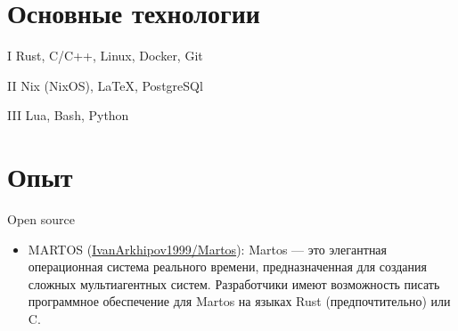 \documentclass{cv}
\begin{document}

\vspace{2em}


\section{Основные технологии}

\begin{cvblock}{I}
	Rust, C/C++, Linux, Docker, Git
\end{cvblock}

\begin{cvblock}{II}
	Nix (NixOS), \LaTeX, PostgreSQl
\end{cvblock}

\begin{cvblock}{III}
    Lua, Bash, Python
\end{cvblock}


\section{Опыт}


\begin{cvblock}{Open source}
	\begin{itemize}
		\item MARTOS
		      (\url{IvanArkhipov1999/Martos}):
              Martos — это элегантная операционная система реального времени, предназначенная для создания сложных мультиагентных систем. Разработчики имеют возможность писать программное обеспечение для Martos на языках Rust (предпочтительно) или C.
      \end{itemize}
\end{cvblock}
\end{document}
